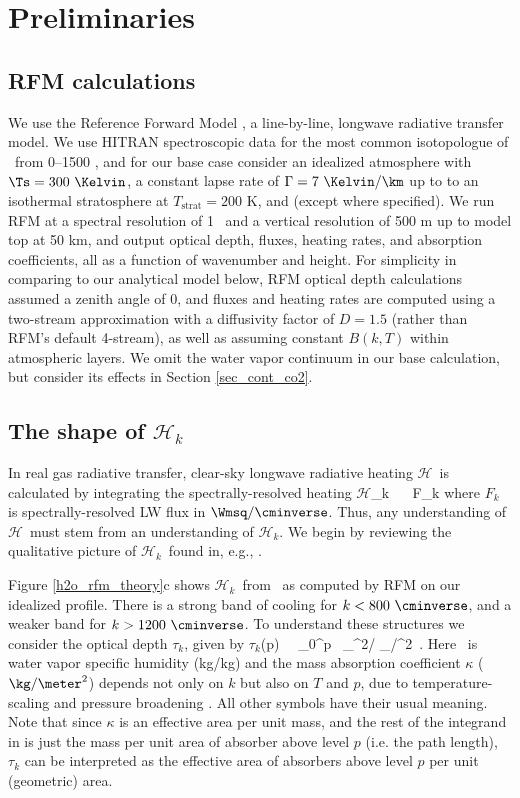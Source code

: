 \documentclass[10pt]{article}
\newcommand{\ch}{\ensuremath{\mathcal{H}}}
\newcommand{\chk}{\ensuremath{\ch_k}}
\newcommand{\tauk}{\ensuremath{\tau_k}}
\newcommand{\Tstrat}{\ensuremath{T_{\mathrm{strat}}}}
\begin{document}
\section{Preliminaries}
\subsection{RFM calculations} \label{sec_rfm_calcs}
We use the Reference Forward Model \citep[RFM,][]{dudhia2017}, a line-by-line, longwave radiative transfer model. We use HITRAN spectroscopic data for the most common isotopologue of \htwo\ from 0--1500 \cminverse, and for our base case consider an idealized atmosphere with $\Ts=300\ \Kelvin$,  a constant lapse rate of $\Gamma= 7\ \Kelvin/\km$ up to to an isothermal stratosphere at $\Tstrat=200$ K, and  (except where specified). We run RFM at a spectral resolution of 1 \cminverse\ and a vertical resolution of 500 m up to model top at 50 km, and output optical depth, fluxes, heating rates, and absorption coefficients, all as a function of wavenumber and height. For simplicity in comparing to our analytical model below, RFM optical depth calculations assumed a zenith angle of 0, and fluxes and heating rates are computed using a two-stream approximation with a diffusivity factor of $D=1.5$ (rather than RFM's default 4-stream), as well as assuming constant $B(k,T)$ within atmospheric layers.  We omit the water vapor continuum in our base calculation, but consider its effects in Section \ref{sec_cont_co2}.  

\subsection{The shape of \chk}
In real gas radiative transfer, clear-sky longwave radiative heating \ch\ is calculated by  integrating the spectrally-resolved heating 
\beqn
	\ch_k \ \equiv \  \ppp F_k \quad {}
	\label{heat_k}
\eeqn
where $F_k$ is spectrally-resolved LW flux in $\Wmsq/\cminverse$. Thus,  any understanding of \ch\ must stem from an understanding of \chk. We begin by reviewing the qualitative picture of \chk\  found in, e.g., \cite{clough1992}.


Figure \ref{h2o_rfm_theory}c shows \chk\ from \htwo\ as computed by RFM on our idealized profile. There is a strong band of cooling for $k< 800\ \cminverse$, and a weaker band for $k > 1200\ \cminverse$. To understand these structures we consider   the optical depth $\tauk$, given by
\beqn
	\tauk(p) \ \equiv  \ \int_0^p \, _{\meter^2/\kg} _{\kg/\meter^2}\ .
	\label{tauk}
\eeqn
Here \qv\ is water vapor specific humidity (kg/kg) and the mass absorption coefficient $\kappa$ ($\kg/\meter^2$) depends not only on $k$ but also on $T$ and $p$,  due to temperature-scaling and pressure broadening \citep[][]{pierrehumbert2010}. All other symbols have their usual meaning. Note that since $\kappa$ is an effective area per unit mass, and the rest of the integrand in  is just the mass per unit area of absorber above level $p$ (i.e. the path length), $\tauk$ can be interpreted as the effective area of absorbers above level $p$ per unit (geometric) area.
\end{document}
